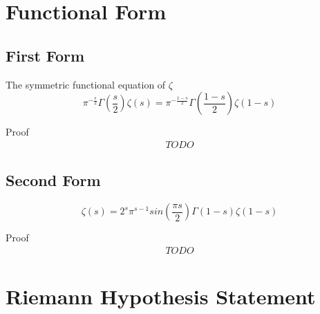 \documentclass[a4paper]{article}
\begin{document}


\section{Functional Form}
\subsection{First Form}

\begin{theorem}
The symmetric functional equation of $\zeta$
\begin{equation} 
\boxed{
\pi^{-\frac{s}{2}} \Gamma(\frac{s}{2}) \zeta(s) = \pi^{- \frac{1-s}{2}} \Gamma(\frac{1-s}{2}) \zeta(1-s)
}
\end{equation}

Proof
\begin{gather*}
TODO 
\end{gather*}
\end{theorem}

\subsection{Second Form}
\begin{theorem}
\begin{equation} 
\boxed{
\zeta(s) = 2^s \pi^{s-1} sin(\frac{\pi s}{2}) \Gamma (1-s) \zeta(1-s)
}
\end{equation}

Proof
\begin{gather*}
TODO 
\end{gather*}
\end{theorem}

\section{Riemann Hypothesis Statement}
\end{document}

